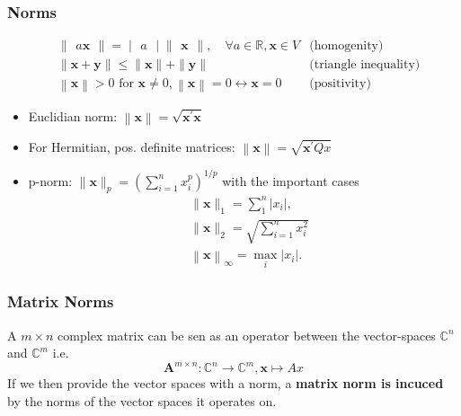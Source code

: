 \subsubsection{Norms}

\begin{align*}
     & \begin{Vmatrix}a\mathbf{x}\end{Vmatrix}  =\begin{vmatrix}a\end{vmatrix}\begin{Vmatrix}\mathbf{x}\end{Vmatrix},\quad\forall a\in\mathbb{R},\mathbf{x}\in V & \text{(homogenity)}          \\
     & \|\mathbf{x}+\mathbf{y}\|                         \leq\|\mathbf{x}\|+\|\mathbf{y}\|                                                                       & \text{(triangle inequality)} \\
     & \left\|\mathbf{x}\right\|                >0 \text{ for } \mathbf{x}\neq0, \left\|\mathbf{x}\right\|=0\leftrightarrow \mathbf{x}=0                         & \text{(positivity)}
\end{align*}

\begin{itemize}
    \item Euclidian norm: $\left\|\mathbf{x}\right\|=\sqrt{\mathbf{x}^{\prime}\mathbf{x}}$
    \item For Hermitian, pos. definite matrices: $\left\|\mathbf{x}\right\|=\sqrt{\mathbf{x}^{\prime}Qx}$
    \item p-norm: $\|\mathbf{x}\|_p=\left(\sum_{i=1}^nx_i^p\right)^{1/p}$ with the important cases
          \begin{align*}
               & \|\mathbf{x}\|_1=\sum_1^n\left|x_i\right|,               \\
               & \|\mathbf{x}\|_2=\sqrt{\sum_{i=1}^nx_i^2}                \\
               & \left\|\mathbf{x}\right\|_\infty=\max_i\left|x_i\right|.
          \end{align*}
\end{itemize}

\subsubsection{Matrix Norms}
A $m\times n$ complex matrix can be sen as an operator between the vector-spaces $\mathbb{C}^n$ and $\mathbb{C}^m$ i.e.
\begin{equation*}
    \mathbf{A}^{m\times n}:\mathbb{C}^n\to\mathbb{C}^m,\mathbf{x}\mapsto Ax
\end{equation*}
If we then provide the vector spaces with a norm, a \textbf{matrix norm is incuced} by the norms of the vector spaces it operates on.

